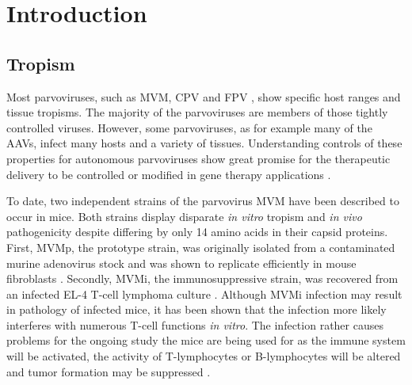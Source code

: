 
\chapter{Introduction} %

\label{Chapter1} %



\section{Tropism}
Most parvoviruses, such as MVM,  CPV  and FPV , show specific host ranges and tissue tropisms. The majority of the parvoviruses are members of those tightly controlled viruses. However, some parvoviruses, as for example many of the AAVs,  infect many hosts and a variety of tissues. Understanding controls of these properties for autonomous parvoviruses show great promise for the therapeutic delivery to be controlled or modified in gene therapy applications \cite{pmid12941411}.  

To date, two independent strains of the parvovirus MVM have been described to occur in mice. Both strains display disparate \textit{in vitro} tropism and \textit{in vivo} pathogenicity despite differing by only 14 amino acids in their capsid proteins. First, MVMp,  the prototype strain, was originally isolated from a contaminated murine adenovirus stock and was shown to replicate efficiently in mouse fibroblasts \cite{pmid5945715}. Secondly, MVMi, the immunosuppressive strain, was recovered from an infected EL-4 T-cell lymphoma culture \cite{ pmid1244418}. Although MVMi infection may result in pathology of infected mice, it has been shown that the infection more likely interferes with numerous T-cell functions \textit{in vitro}. The infection rather causes problems for the ongoing study the mice are being used for as the immune system will be activated, the activity of T-lymphocytes or B-lymphocytes will be altered and tumor formation may be suppressed \cite{pmid6457871, pmid6264106, pmid11528091}.


